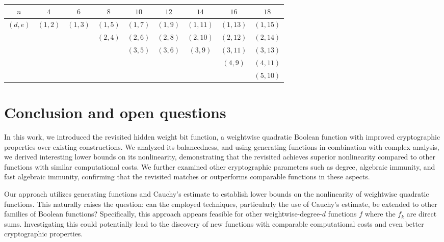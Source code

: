 \documentclass{llncs}
\begin{document}
\begin{table}[ht]
	\small
	\centering
	\begin{tabular}{|c|c|c|c|c|c|c|c|c|}
		\hline
		$ n $      & $4$     & $6$     & $8$     & $10$    & $12$    & $14$    & $16$    & $18$    \\ \hline
		$(d, e)$ & $(1,2)$ & $(1,3)$ & $(1,5)$  & $(1,7)$ & $(1,9)$ & $(1,11)$ & $(1,13)$ & $(1,15)$ \\ 
		&     &    & $(2,4)$  & $(2,6)$ & $(2,8)$ & $(2,10)$ & $(2,12)$ & $(2,14)$\\ 
		&     &    &     & $(3,5)$ & $(3,6)$ & $(3,9)$ & $(3,11)$ & $(3,13)$\\ 
		&     &    &     &  &  &  & $(4,9)$ & $(4,11)$\\ 
	 	&     &    &     &  &  &  &  & $(5,10)$ \\ \hline
	\end{tabular}
	\label{table:FAI}
\end{table}

\section{Conclusion and open questions}

In this work, we introduced the revisited hidden weight bit function, a weightwise quadratic Boolean function with improved cryptographic properties over existing constructions. 
We analyzed its balancedness, and using generating functions in combination with complex analysis, we derived interesting lower bounds on its nonlinearity, demonstrating that the revisited \hwbf{} achieves superior nonlinearity compared to other functions with similar computational costs. 
We further examined other cryptographic parameters such as degree, algebraic immunity, and fast algebraic immunity, confirming that the revisited \hwbf{} matches or outperforms comparable functions in these aspects.

Our approach utilizes generating functions and Cauchy’s estimate to establish lower bounds on the nonlinearity of weightwise quadratic functions. 
This naturally raises the question: can the employed techniques, particularly the use of Cauchy’s estimate, be extended to other families of Boolean functions? Specifically, this approach appears feasible for other weightwise-degree-$d$ functions $f$ where the $f_k$ are direct sums. 
Investigating this could potentially lead to the discovery of new functions with comparable computational costs and even better cryptographic properties.
\end{document}
